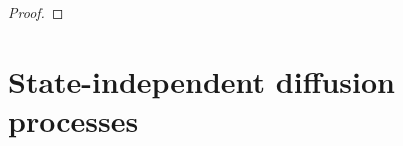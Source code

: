 \documentclass[]{interact}
\newcommand{\1}{\mathbf{1}}
\theoremstyle{plain}%
\theoremstyle{definition}
\theoremstyle{remark}
\numberwithin{equation}{section}
\begin{document}
\begin{proof}
%
%


\noindent

\end{proof}




\section{State-independent diffusion processes}
\label{sec:simplifiedformula}
\end{document}
